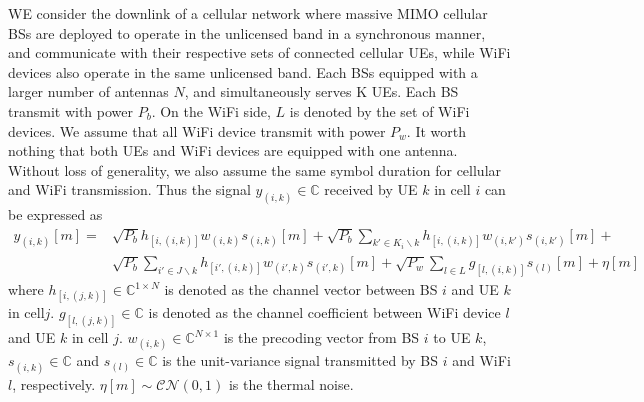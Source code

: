 \documentclass[12pt, onecolumn]{IEEEtran}
\begin{document}
  WE consider the downlink of a cellular network where  massive MIMO cellular BSs are deployed to operate in the unlicensed band in a synchronous manner, and communicate with their respective sets of connected cellular UEs, while WiFi devices also operate in the same unlicensed band.  Each BSs equipped with  a larger number of antennas $N$, and  simultaneously serves K UEs. Each BS transmit with power $P_{b}$. On the WiFi side, $L$ is denoted by the set of WiFi devices. We assume that all WiFi device transmit with power $P_{w}$.  It worth nothing that both UEs and WiFi devices are equipped with one antenna.  Without loss of generality, we also assume the same symbol duration for cellular and WiFi transmission. Thus the   signal $y_{(i,k)}\in{}\mathbb{C}$ received by  UE $k$ in cell $i$   can  be expressed as
 \begin{equation}\label{EQU:ChannelModel}
    \begin{aligned}
        y_{(i,k)}[m] = & \sqrt{P_{b}}h_{[i,(i,k)]}w_{(i,k)}s_{(i,k)}[m] + \sqrt{P_{b}}\sum_{k'\in{}K_{i}\backslash{}k}h_{[i,(i,k)]}w_{(i,k')}s_{(i,k')}[m] +  \\ & \sqrt{P_{b}}\sum_{i'\in{}J\backslash{}k}h_{[i',(i,k)]}w_{(i',k)}s_{(i',k)}[m] +    \sqrt{P_{w}}\sum_{l\in{}L}g_{[l,(i,k)]}s_{(l)}[m]  +  \eta[m]
    \end{aligned}
\end{equation}
where $h_{[i,(j,k)]} \in{}\mathbb{C}^{1\times{}N}$ is denoted as the channel vector between BS $i$ and UE $k$ in cell$j$.  $g_{[l,(j,k)]} \in{}\mathbb{C}$ is denoted as the channel coefficient  between WiFi device $l$ and UE  $k$ in cell $j$. $w_{(i,k)}\in{}\mathbb{C}^{N\times{}1}$ is the precoding vector from BS $i$ to UE $k$, $s_{(i,k)}\in{}\mathbb{C}$ and $s_{(l)}\in{}\mathbb{C}$ is the unit-variance signal transmitted by BS $i$ and WiFi $l$, respectively.  $\eta[m]\sim \mathcal{CN}(0,1)$ is the thermal noise.
\end{document}
